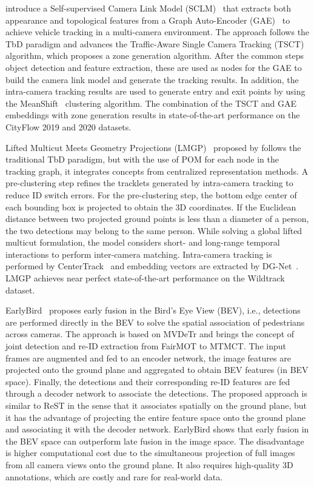 \citeauthor{Hsu22} introduce a Self-supervised Camera Link Model (SCLM)~\cite{Hsu22} that extracts both appearance and topological features from a Graph Auto-Encoder (GAE)~\cite{Kipf16} to achieve vehicle tracking in a multi-camera environment. The approach follows the TbD paradigm and advances the Traffic-Aware Single Camera Tracking (TSCT)~\cite{Hsu20} algorithm, which proposes a zone generation algorithm. After the common steps object detection and feature extraction, these are used as nodes for the GAE to build the camera link model and generate the tracking results. In addition, the intra-camera tracking results are used to generate entry and exit points by using the MeanShift~\cite{Comaniciu02} clustering algorithm. The combination of the TSCT and GAE embeddings with zone generation results in state-of-the-art performance on the CityFlow 2019 and 2020 datasets.

Lifted Multicut Meets Geometry Projections (LMGP)~\cite{Nguyen22a} proposed by \citeauthor{Nguyen22a} follows the traditional TbD paradigm, but with the use of POM for each node in the tracking graph, it integrates concepts from centralized representation methods. A pre-clustering step refines the tracklets generated by intra-camera tracking to reduce ID switch errors. For the pre-clustering step, the bottom edge center of each bounding box is projected to obtain the 3D coordinates. If the Euclidean distance between two projected ground points is less than a diameter of a person, the two detections may belong to the same person. While solving a global lifted multicut formulation, the model considers short- and long-range temporal interactions  to perform inter-camera matching. Intra-camera tracking is performed by CenterTrack~\cite{Zhou20} and embedding vectors are extracted by DG-Net~\cite{Zheng19}. LMGP achieves near perfect state-of-the-art performance on the Wildtrack dataset.

EarlyBird~\cite{Teepe23} proposes early fusion in the Bird's Eye View (BEV), i.e., detections are performed directly in the BEV to solve the spatial association of pedestrians across cameras. The approach is based on MVDeTr and brings the concept of joint detection and re-ID extraction from FairMOT to MTMCT. The input frames are augmented and fed to an encoder network, the image features are projected onto the ground plane and aggregated to obtain BEV features (in BEV space). Finally, the detections and their corresponding re-ID features are fed through a decoder network to associate the detections. The proposed approach is similar to ReST in the sense that it associates spatially on the ground plane, but it has the advantage of projecting the entire feature space onto the ground plane and associating it with the decoder network. EarlyBird shows that early fusion in the BEV space can outperform late fusion in the image space. The disadvantage is higher computational cost due to the simultaneous projection of full images from all camera views onto the ground plane. It also requires high-quality 3D annotations, which are costly and rare for real-world data.

